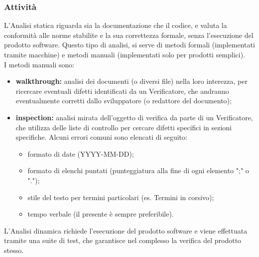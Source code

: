     \subsubsection{Attività}
          L'Analisi statica riguarda sia la documentazione che il codice, e valuta la conformità alle norme stabilite e la sua correttezza formale, senza l'esecuzione del prodotto software. Questo tipo di analisi, si serve di metodi formali (implementati tramite macchine) e metodi manuali (implementati solo per prodotti semplici).\\ I metodi manuali sono:
          \begin{itemize}
            \item \textbf{walkthrough:} analisi dei documenti (o diversi file) nella loro interezza, per ricercare eventuali difetti identificati da un Verificatore, che andranno eventualmente corretti dallo sviluppatore (o redattore del documento);
            \item \textbf{inspection:} analisi mirata dell'oggetto di verifica da parte di un Verificatore, che utilizza delle liste di controllo per cercare difetti specifici in sezioni specifiche. Alcuni errori comuni sono elencati di seguito:
              \begin{itemize}
                \item formato di date (YYYY-MM-DD);
                \item formato di elenchi puntati (punteggiatura alla fine di ogni elemento ";" o ".");
                \item stile del testo per termini particolari (es. Termini in corsivo);
                \item tempo verbale (il presente è sempre preferibile).
              \end{itemize}
          \end{itemize}

          L'Analisi dinamica richiede l'esecuzione del prodotto software e viene effettuata tramite una suite di test, che garantisce nel complesso la verifica del prodotto stesso.

